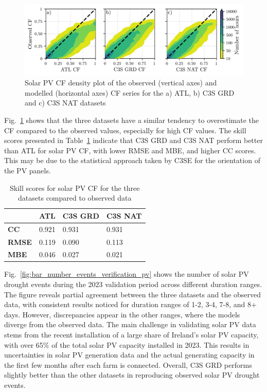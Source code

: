 \documentclass[preprint, 12pt]{elsarticle}
\begin{document}
\begin{figure}[h!]
	\centering
	\includegraphics[width=\textwidth]{verification_pv_contour.png}
	\caption{Solar PV CF density plot of the observed (vertical axes) and modelled (horizontal axes) CF series for the a) ATL, b) C3S GRD and c) C3S NAT datasets}	
	\label{fig:solar_verification_contour}
\end{figure}

Fig.~\ref{fig:solar_verification_contour} shows that the three datasets have a similar tendency to overestimate the CF compared to the observed values, especially for high CF values. The skill scores presented in Table~\ref{tab:pv_skill_scores} indicate that C3S GRD and C3S NAT perform better than ATL for solar PV CF, with lower RMSE and MBE, and higher CC scores. This may be due to the statistical approach taken by C3SE for the orientation of the PV panels.

\begin{table}[!ht]
	\centering
	\begin{tabular}{l|lll|}
		\cline{2-4}
		& \textbf{ATL} & \textbf{C3S GRD} & \textbf{C3S NAT} \\ \hline
		\multicolumn{1}{|l|}{\textbf{CC}}   & 0.921           & 0.931            & 0.931            \\ \hline
		\multicolumn{1}{|l|}{\textbf{RMSE}} & 0.119           & 0.090            & 0.113            \\ \hline
		\multicolumn{1}{|l|}{\textbf{MBE}}   & 0.046           & 0.027           & 0.021           \\ \hline
	\end{tabular}
	\caption{Skill scores for solar PV CF for the three datasets compared to observed data}
	\label{tab:pv_skill_scores}
\end{table}

Fig.~\ref{fig:bar_number_events_verification_pv} shows the number of solar PV drought events during the 2023 validation period across different duration ranges. The figure reveals partial agreement between the three datasets and the observed data, with consistent results noticed for duration ranges of 1-2, 3-4, 7-8, and 8+ days. However, discrepancies appear in the other ranges, where the models diverge from the observed data. The main challenge in validating solar PV data stems from the recent installation of a large share of Ireland’s solar PV capacity, with over 65\% of the total solar PV capacity installed in 2023. This results in uncertainties in solar PV generation data and the actual generating capacity in the first few months after each farm is connected. Overall, C3S GRD performs slightly better than the other datasets in reproducing observed solar PV drought events.
\end{document}
